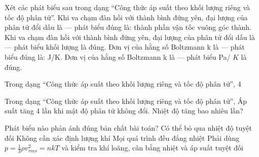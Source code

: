 \begin{ex}
Xét các phát biểu sau trong dạng “Công thức áp suất theo khối lượng riêng và tốc độ phân tử”.
\choiceTF
{\True Khi va chạm đàn hồi với thành bình đứng yên, đại lượng của phân tử đổi dấu là — phát biểu đúng là: thành phần vận tốc vuông góc thành.}
{Khi va chạm đàn hồi với thành bình đứng yên, đại lượng của phân tử đổi dấu là — phát biểu khối lượng là đúng.}
{\True Đơn vị của hằng số Boltzmann k là — phát biểu đúng là: J/K.}
{Đơn vị của hằng số Boltzmann k là — phát biểu Pa/ $K$ là đúng.}
\end{ex}

\begin{ex}
Trong dạng “Công thức áp suất theo khối lượng riêng và tốc độ phân tử”, 4
\choiceTF

\end{ex}

\begin{ex}
Trong dạng “Công thức áp suất theo khối lượng riêng và tốc độ phân tử”, Áp suất tăng 4 lần khi mật độ phân tử không đổi. Nhiệt độ tăng bao nhiêu lần?
\end{ex}

\begin{ex}
Phát biểu nào phản ánh đúng bản chất bài toán?
\choice
{Có thể bỏ qua nhiệt độ tuyệt đối}
{Không cần xác định lượng khí}
{Mọi quá trình đều đẳng nhiệt}
{\True Phải dùng $p=\frac13\rho v_{rms}^2=nkT$ và kiểm tra khí loãng, cân bằng nhiệt và áp suất tuyệt đối}
\end{ex}

